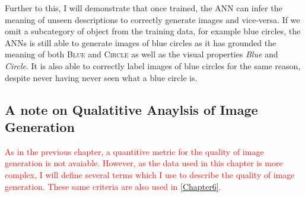 Further to this, I will demonstrate that once trained, the \ac{ANN} can infer the meaning of unseen descriptions to correctly generate images and vice-versa. If we omit a subcategory of object from the training data, for example blue circles, the \acp{ANN} is still able to generate images of blue circles as it has grounded the meaning of both \textsc{Blue} and \textsc{Circle} as well as the visual properties \textit{Blue} and \textit{Circle}. It is also able to correctly label images of blue circles for the same reason, despite never having never seen what a blue circle is.

\subsection{A note on Qualatitive Anaylsis of Image Generation}
\textcolor{red}{As in the previous chapter, a quantitive metric for the quality of image generation is not avaiable. However, as the data used in this chapter is more complex, I will define several terms which I use to describe the quality of image generation. These same criteria are also used in \autoref{Chapter6}.}


